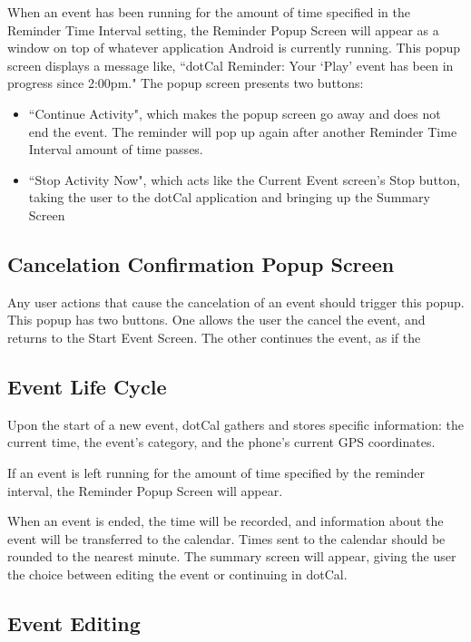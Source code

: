 \documentclass[11pt]{article}
\begin{document}
When an event has been running for the amount of time specified in the Reminder Time Interval setting, the Reminder Popup Screen will appear as a window on top of whatever application Android is currently running. This popup screen displays a message like, ``dotCal Reminder: Your `Play' event has been in progress since 2:00pm." The popup screen presents two buttons:
\begin{itemize}
	\item{``Continue Activity", which makes the popup screen go away and does not end the event. The reminder will pop up again after another Reminder Time Interval amount of time passes.}
	\item{``Stop Activity Now", which acts like the Current Event screen's Stop button, taking the user to the dotCal application and bringing up the Summary Screen}
\end{itemize}

\subsection{Cancelation Confirmation Popup Screen}

Any user actions that cause the cancelation of an event should trigger this popup. This popup has two buttons. One allows the user the cancel the event, and returns to the Start Event Screen. The other continues the event, as if the 

\subsection{Event Life Cycle}

Upon the start of a new event, dotCal gathers and stores specific information: the current time, the event's category, and the phone's current GPS coordinates. 

If an event is left running for the amount of time specified by the reminder interval, the Reminder Popup Screen will appear.

When an event is ended, the time will be recorded, and information about the event will be transferred to the calendar. Times sent to the calendar should be  rounded to the nearest minute. The summary screen will appear, giving the user the choice between editing the event or continuing in dotCal.


\subsection{Event Editing}
\end{document}
